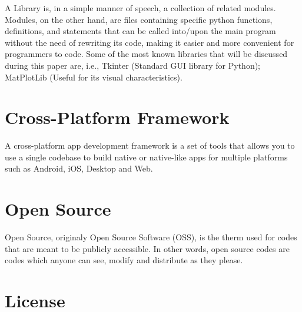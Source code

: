 
A Library is, in a simple manner of speech, a collection of related modules.
Modules, on the other hand, are files containing specific python functions, definitions, and statements that can be called into/upon the main program without the need of rewriting its code, making it easier and more convenient for programmers to code.
Some of the most known libraries that will be discussed during this paper are, i.e., Tkinter (Standard GUI library for Python); MatPlotLib (Useful for its visual characteristics). 

\section{Cross-Platform Framework} 
\label{sub:cp_framework}


A cross-platform app development framework is a set of tools that allows you to use a single codebase to build native or native-like apps for multiple platforms such as Android, iOS, Desktop and Web.

\section{Open Source }
\label{sub:open_source}

Open Source, originaly Open Source Software (OSS), is the therm used for codes that are meant to be publicly accessible. In other words, open source codes are codes which anyone can see, modify and distribute as they please. %

\section{License} 
\label{sub:license}


